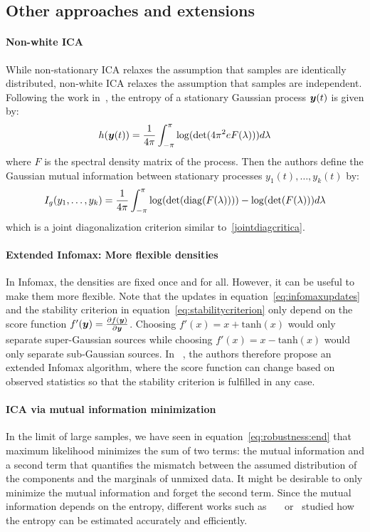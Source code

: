 \subsection{Other approaches and extensions}

\paragraph{Non-white ICA} While non-stationary ICA relaxes the assumption that samples are identically
distributed, non-white ICA relaxes the assumption that samples are independent.
Following the work in~\cite{pham2001blindb}, the entropy of a stationary Gaussian process $\boldsymbol{y}(t)$ is given by:
\begin{align}
h(\boldsymbol{y}(t)) = \frac1{4 \pi} \int_{-\pi}^{\pi} \log(\det(4 \pi^2 e F(\lambda))) d\lambda
\end{align}
where $F$ is the spectral density matrix of the process.
Then the authors define the Gaussian mutual information between stationary processes $y_1(t), \dots,
y_k(t)$ by:
\begin{align}
  I_g(y_1, \dots, y_k) = \frac1{4 \pi} \int_{-\pi}^{\pi}  \log(\det( \operatorname*{diag}(F(\lambda)))) - \log(\det( F(\lambda))) d\lambda
\end{align}
which is a joint diagonalization criterion similar to~\eqref{jointdiagcritica}.


\paragraph{Extended Infomax: More flexible densities} In Infomax, the densities are fixed once and
for all. However, it can be useful to make them more flexible.
Note that the updates in
equation~\eqref{eq:infomaxupdates} and the stability criterion in
equation~\eqref{eq:stabilitycriterion} only depend on the score function
$f'(\boldsymbol{y}) = \frac{ \partial f(\boldsymbol{y})}{\partial \boldsymbol{y}}$.
Choosing $f'(x) = x + \mathrm{tanh}(x)$ would only separate super-Gaussian sources while
choosing $f'(x) = x - \mathrm{tanh}(x)$ would only separate sub-Gaussian sources.
In ~\cite{lee1999independent}, the authors therefore propose an extended Infomax
algorithm, where the score function can change based on observed statistics so that the
stability criterion is fulfilled in any case.

\paragraph{ICA via mutual information minimization} In the limit of large
samples, we have seen in equation~\eqref{eq:robustness:end} that maximum
likelihood minimizes the sum of two terms: the mutual information and a second
term that quantifies the mismatch between the assumed distribution of the
components and the marginals of unmixed data. It might be desirable to only
minimize the mutual information and forget the second term. Since the mutual
information depends on the entropy, different works such as~\cite{hyvarinen1998analysis}~\cite{li2009novel}~\cite{li2010blind} or~\cite{li2010independent}
studied how the entropy can be estimated accurately and efficiently.






